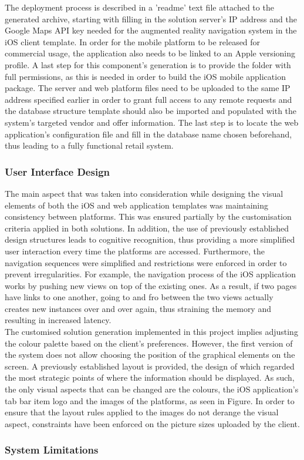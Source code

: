 The deployment process is described in a 'readme' text file attached to the generated archive, starting with filling in the solution server's IP address and the Google Maps API key needed for the augmented reality navigation system in the iOS client template. In order for the mobile platform to be released for commercial usage, the application also needs to be linked to an Apple versioning profile. A last step for this component's generation is to provide the folder with full permissions, as this is needed in order to build the iOS mobile application package. The server and web platform files need to be uploaded to the same IP address specified earlier in order to grant full access to any remote requests and the database structure template should also be imported and populated with the system's targeted vendor and offer information. The last step is to locate the web application's configuration file and fill in the database name chosen beforehand, thus leading to a fully functional retail system.\\

\subsubsection{User Interface Design}

The main aspect that was taken into consideration while designing the visual elements of both the iOS and web application templates was maintaining consistency between platforms. This was ensured partially by the customisation criteria applied in both solutions. In addition, the use of previously established design structures leads to cognitive recognition, thus providing a more simplified user interaction every time the platforms are accessed. Furthermore, the navigation sequences were simplified and restrictions were enforced in order to prevent irregularities. For example, the navigation process of the iOS application works by pushing new views on top of the existing ones. As a result, if two pages have links to one another, going to and fro between the two views actually creates new instances over and over again, thus straining the memory and resulting in increased latency.\\

The customised solution generation implemented in this project implies adjusting the colour palette based on the client's preferences. However, the first version of the system does not allow choosing the position of the graphical elements on the screen. A previously established layout is provided, the design of which regarded the most strategic points of where the information should be displayed. As such, the only visual aspects that can be changed are the colours, the iOS application's tab bar item logo and the images of the platforms, as seen in Figure. In order to ensure that the layout rules applied to the images do not derange the visual aspect, constraints have been enforced on the picture sizes uploaded by the client.\\

\subsubsection{System Limitations}










